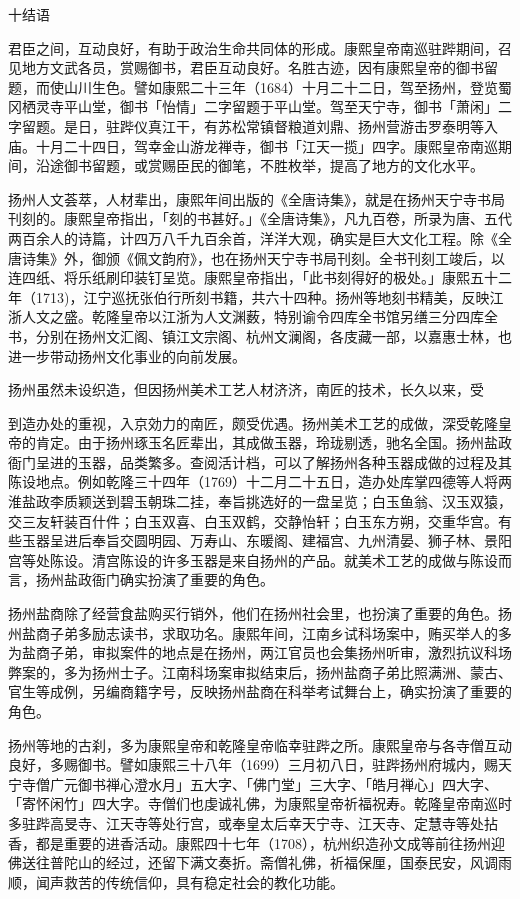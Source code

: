 十结语

君臣之间，互动良好，有助于政治生命共同体的形成。康熙皇帝南巡驻跸期间，召见地方文武各员，赏赐御书，君臣互动良好。名胜古迹，因有康熙皇帝的御书留题，而使山川生色。譬如康熙二十三年（1684）十月二十二日，驾至扬州，登览蜀冈栖灵寺平山堂，御书「怡情」二字留题于平山堂。驾至天宁寺，御书「萧闲」二字留题。是日，驻跸仪真江干，有苏松常镇督粮道刘鼎、扬州营游击罗泰明等入庙。十月二十四日，驾幸金山游龙禅寺，御书「江天一揽」四字。康熙皇帝南巡期间，沿途御书留题，或赏赐臣民的御笔，不胜枚举，提高了地方的文化水平。

扬州人文荟萃，人材辈出，康熙年间出版的《全唐诗集》，就是在扬州天宁寺书局刊刻的。康熙皇帝指出，「刻的书甚好。」《全唐诗集》，凡九百卷，所录为唐、五代两百余人的诗篇，计四万八千九百余首，洋洋大观，确实是巨大文化工程。除《全唐诗集》外，御颁《佩文韵府》，也在扬州天宁寺书局刊刻。全书刊刻工竣后，以连四纸、将乐纸刷印装钉呈览。康熙皇帝指出，「此书刻得好的极处。」康熙五十二年（1713)，江宁巡抚张伯行所刻书籍，共六十四种。扬州等地刻书精美，反映江浙人文之盛。乾隆皇帝以江浙为人文渊薮，特别谕令四库全书馆另缮三分四库全书，分别在扬州文汇阁、镇江文宗阁、杭州文澜阁，各庋藏一部，以嘉惠士林，也进一步带动扬州文化事业的向前发展。

扬州虽然未设织造，但因扬州美术工艺人材济济，南匠的技术，长久以来，受


\noindent 到造办处的重视，入京効力的南匠，颇受优遇。扬州美术工艺的成做，深受乾隆皇帝的肯定。由于扬州琢玉名匠辈出，其成做玉器，玲珑剔透，驰名全国。扬州盐政衙门呈进的玉器，品类繁多。查阅活计档，可以了解扬州各种玉器成做的过程及其陈设地点。例如乾隆三十四年（1769）十二月二十五日，造办处库掌四德等人将两淮盐政李质颖送到碧玉朝珠二挂，奉旨挑选好的一盘呈览；白玉鱼翁、汉玉双猿，交三友轩装百什件；白玉双喜、白玉双鹤，交静怡轩；白玉东方朔，交重华宫。有些玉器呈进后奉旨交圆明园、万寿山、东暖阁、建福宫、九州清晏、狮子林、景阳宫等处陈设。清宫陈设的许多玉器是来自扬州的产品。就美术工艺的成做与陈设而言，扬州盐政衙门确实扮演了重要的角色。

扬州盐商除了经营食盐购买行销外，他们在扬州社会里，也扮演了重要的角色。扬州盐商子弟多励志读书，求取功名。康熙年间，江南乡试科场案中，贿买举人的多为盐商子弟，审拟案件的地点是在扬州，两江官员也会集扬州听审，激烈抗议科场弊案的，多为扬州士子。江南科场案审拟结束后，扬州盐商子弟比照满洲、蒙古、官生等成例，另编商籍字号，反映扬州盐商在科举考试舞台上，确实扮演了重要的角色。

扬州等地的古刹，多为康熙皇帝和乾隆皇帝临幸驻跸之所。康熙皇帝与各寺僧互动良好，多赐御书。譬如康熙三十八年（1699）三月初八日，驻跸扬州府城内，赐天宁寺僧广元御书禅心澄水月」五大字、「佛门堂」三大字、「皓月禅心」四大字、「寄怀闲竹」四大字。寺僧们也虔诚礼佛，为康熙皇帝祈福祝寿。乾隆皇帝南巡时多驻跸高旻寺、江天寺等处行宫，或奉皇太后幸天宁寺、江天寺、定慧寺等处拈香，都是重要的进香活动。康熙四十七年（1708），杭州织造孙文成等前往扬州迎佛送往普陀山的经过，还留下满文奏折。斋僧礼佛，祈福保厘，国泰民安，风调雨顺，闻声救苦的传统信仰，具有稳定社会的教化功能。


